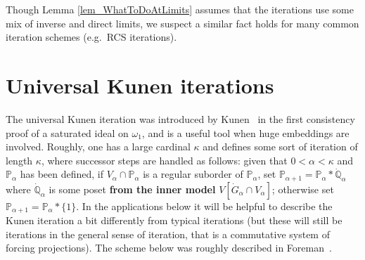 \documentclass{amsart}
\begin{document}
Though Lemma \ref{lem_WhatToDoAtLimits} assumes that the iterations use some mix of inverse and direct limits, we suspect a similar fact holds for many common iteration schemes (e.g.\ RCS iterations).

\section{Universal Kunen iterations}\label{sec_KunenUniversal}


The universal Kunen iteration was introduced by Kunen~\cite{MR495118} in the first consistency proof of a saturated ideal on $\omega_1$, and is a useful tool when huge embeddings are involved.  Roughly, one has a large cardinal $\kappa$ and defines some sort of iteration of length $\kappa$, where successor steps are handled as follows:  given that $0< \alpha < \kappa$ and $\mathbb{P}_\alpha$ has been defined, if $V_\alpha \cap \mathbb{P}_\alpha$ is a regular suborder of $\mathbb{P}_\alpha$, set $\mathbb{P}_{\alpha+1} = \mathbb{P}_\alpha * \dot{\mathbb{Q}}_\alpha$ where $\dot{\mathbb{Q}}_\alpha$ is some poset \textbf{from the inner model} $V[\dot{G}_\alpha \cap V_\alpha]$; otherwise set $\mathbb{P}_{\alpha+1} = \mathbb{P}_\alpha * \{ 1 \}$.  In the applications below it will be helpful to describe the Kunen iteration a bit differently from typical iterations (but these will still be iterations in the general sense of iteration, that is a commutative system of forcing projections).  The scheme below was roughly described in Foreman~\cite{MattHandbook}.
\end{document}
